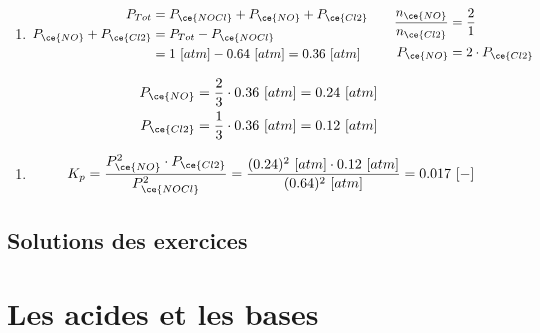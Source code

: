 \documentclass[
  11pt,
  a4paper,
  openany]{book}
\providecommand{\tightlist}{%
  \setlength{\itemsep}{0pt}\setlength{\parskip}{0pt}}
\begin{document}
\begin{Answer}

\begin{enumerate}
\def\labelenumi{\alph{enumi}.}
\tightlist
\item
  \[
  \begin{split}
  P_{Tot} &= P_{\ce{NOCl}} + P_{\ce{NO}} + P_{\ce{Cl2}} \\
  P_{\ce{NO}} + P_{\ce{Cl2}} &= P_{Tot} - P_{\ce{NOCl}} \\
  &= 1\ [atm] - 0.64\ [atm] = 0.36\ [atm]
  \end{split}
  \qquad
  \begin{split}
  \frac{n_{\ce{NO}}}{n_{\ce{Cl2}}} &= \frac{2}{1} \\
  P_{\ce{NO}} &= 2 \cdot P_{\ce{Cl2}}
  \end{split}
  \]
\end{enumerate}

\[
\begin{split}
P_{\ce{NO}} &= \frac{2}{3} \cdot 0.36\ [atm] = 0.24\ [atm] \\
P_{\ce{Cl2}} &= \frac{1}{3} \cdot 0.36\ [atm] = 0.12\ [atm]
\end{split}
\]

\begin{enumerate}
\def\labelenumi{\alph{enumi}.}
\setcounter{enumi}{1}
\tightlist
\item
  \[
  \begin{split}
  K_{p} = \frac{P_{\ce{NO}}^2 \cdot P_{\ce{Cl2}} }{P_{\ce{NOCl}}^2} = \frac{(0.24)^2\ [atm] \cdot 0.12\ [atm]}{(0.64)^2\ [atm]} = 0.017\ [-]
  \end{split}
  \]
\end{enumerate}

\end{Answer}

\clearpage

\section{Solutions des exercices} \shipoutAnswer

\chapter{Les acides et les bases}\label{les-acides-et-les-bases}
\end{document}
